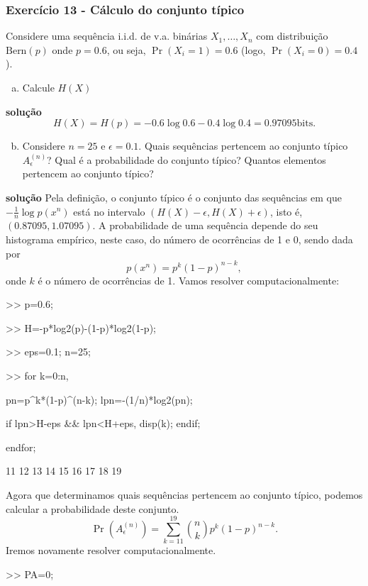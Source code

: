 \begin{frame}[allowframebreaks]
  \frametitle{Exercício 13 - Cálculo do conjunto típico}
  \begin{exercise}
  Considere uma sequência i.i.d. de v.a. binárias $X_1, \ldots, X_n$ com distribuição $\text{Bern}(p)$
  onde $p=0.6$, ou seja, $\Pr(X_i = 1) = 0.6$ (logo, $\Pr(X_i = 0) = 0.4$).

  \begin{enumerate}[a)]
  \item Calcule $H(X)$
  \end{enumerate}
  \textbf{solução}
  \begin{equation}
  H(X) = H(p) = -0.6 \log 0.6 -0.4 \log 0.4 = 0.97095 \text{bits}.
  \end{equation}

  \exercisebreak
  \begin{enumerate}[a)]
  \setcounter{enumi}{1}
  \item Considere $n=25$ e $\epsilon=0.1$. Quais sequências pertencem ao conjunto típico $A_{\epsilon}^{(n)}$?
  Qual é a probabilidade do conjunto típico? Quantos elementos pertencem ao conjunto típico?
  \end{enumerate}
  \textbf{solução}
  Pela definição, o conjunto típico é o conjunto das sequências em que $-\frac{1}{n} \log p(x^n)$ está
  no intervalo $(H(X)-\epsilon,H(X)+\epsilon)$, isto é, $(0.87095,1.07095)$. A probabilidade de uma sequência
  depende do seu histograma empírico, neste caso, do número de ocorrências de 1 e 0, sendo dada por
  \begin{equation}
  p(x^n) = p^k (1-p)^{n-k}, 
  \end{equation}
  onde $k$ é o número de ocorrências de 1. Vamos resolver computacionalmente:
  \exercisebreak
  \begin{semiverbatim}
  >> p=0.6;

  >> H=-p*log2(p)-(1-p)*log2(1-p);

  >> eps=0.1; n=25;

  >> for k=0:n, 

	pn=p\^{ }k*(1-p)\^{ }(n-k); 
	lpn=-(1/n)*log2(pn); 

	if lpn>H-eps \&\& lpn<H+eps, disp(k); endif; 

     endfor;

   11
   12
   13
   14
   15
   16
   17
   18
   19
  \end{semiverbatim}
  \exercisebreak
  Agora que determinamos quais sequências pertencem ao conjunto típico, podemos calcular a probabilidade deste conjunto.
  \begin{equation}
  \Pr(A_{\epsilon}^{(n)}) = \sum_{k=11}^{19} {n \choose k} p^k (1-p)^{n-k} .
  \end{equation}
  \exercisebreak
  Iremos novamente resolver computacionalmente.
  \begin{semiverbatim}
  >> PA=0; 


\end{semiverbatim}
\end{exercise}
\end{frame}
